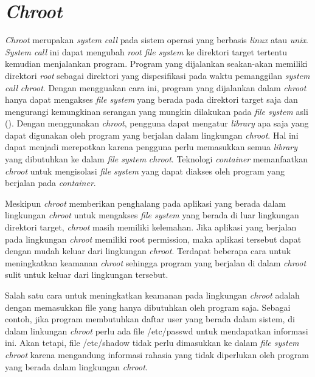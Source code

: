 \section{\textit{Chroot}}

\par \textit{Chroot} merupakan \textit{system call} pada sistem operasi yang berbasis \textit{linux} atau \textit{unix}. \textit{System call} ini dapat mengubah \textit{root file system} ke direktori target tertentu kemudian menjalankan program. Program yang dijalankan seakan-akan memiliki direktori \textit{root} sebagai direktori yang dispesifikasi pada waktu pemanggilan \textit{system call} \textit{chroot}. Dengan mengguakan cara ini, program yang dijalankan dalam \textit{chroot} hanya dapat mengakses \textit{file system} yang berada pada direktori target saja dan mengurangi kemungkinan serangan yang mungkin dilakukan pada \textit{file system} asli (\cite{lessardchroot}). Dengan menggunakan \textit{chroot}, pengguna dapat mengatur \textit{library} apa saja yang dapat digunakan oleh program yang berjalan dalam lingkungan \textit{chroot}. Hal ini dapat menjadi merepotkan karena pengguna perlu memasukkan semua \textit{library} yang dibutuhkan ke dalam \textit{file system} \textit{chroot}. Teknologi \textit{container} memanfaatkan \textit{chroot} untuk mengisolasi \textit{file system} yang dapat diakses oleh program yang berjalan pada \textit{container}.

\par Meskipun \textit{chroot} memberikan penghalang pada aplikasi yang berada dalam lingkungan \textit{chroot} untuk mengakses \textit{file system} yang berada di luar lingkungan direktori target, \textit{chroot} masih memiliki kelemahan. Jika aplikasi yang berjalan pada lingkungan \textit{chroot} memiliki root permission, maka aplikasi tersebut dapat dengan mudah keluar dari lingkungan \textit{chroot}. Terdapat beberapa cara untuk meningkatkan keamanan \textit{chroot} sehingga program yang berjalan di dalam \textit{chroot} sulit  untuk keluar dari lingkungan tersebut.

\par Salah satu cara untuk meningkatkan keamanan pada lingkungan \textit{chroot} adalah dengan memasukkan file yang hanya dibutuhkan oleh program saja. Sebagai contoh, jika program membutuhkan daftar user yang berada dalam sistem, di dalam linkungan \textit{chroot} perlu ada file /etc/passwd untuk mendapatkan informasi ini. Akan tetapi, file /etc/shadow tidak perlu dimasukkan ke dalam \textit{file system} \textit{chroot} karena mengandung informasi rahasia yang tidak diperlukan oleh program yang berada dalam lingkungan \textit{chroot}.

